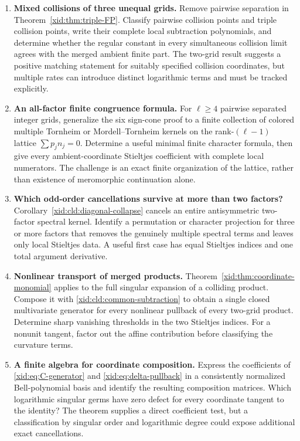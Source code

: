\begin{enumerate}[label=\textbf{Q\arabic*.},leftmargin=*]
\item \textbf{Mixed collisions of three unequal grids.}
Remove pairwise separation in Theorem~\ref{xid:thm:triple-FP}. Classify
pairwise collision points and triple collision points, write their
complete local subtraction polynomials, and determine whether the
regular constant in every simultaneous collision limit agrees with the
merged ambient finite part. The two-grid result suggests a positive
matching statement for suitably specified collision coordinates, but
multiple rates can introduce distinct logarithmic terms and must be
tracked explicitly.

\item \textbf{An all-factor finite congruence formula.}
For $\ell\ge4$ pairwise separated integer grids, generalize the six
sign-cone proof to a finite collection of colored multiple Tornheim or
Mordell--Tornheim kernels on the rank-$(\ell-1)$ lattice
$\sum p_jn_j=0$. Determine a useful minimal finite character formula,
then give every ambient-coordinate Stieltjes coefficient with complete
local numerators. The challenge is an exact finite organization of the
lattice, rather than existence of meromorphic continuation alone.

\item \textbf{Which odd-order cancellations survive at more than two
factors?}
Corollary~\ref{xid:cld:diagonal-collapse} cancels an entire antisymmetric
two-factor spectral kernel. Identify a permutation or character
projection for three or more factors that removes the genuinely
multiple spectral terms and leaves only local Stieltjes data. A useful
first case has equal Stieltjes indices and one total argument derivative.

\item \textbf{Nonlinear transport of merged products.}
Theorem~\ref{xid:thm:coordinate-monomial} applies to the full singular
expansion of a colliding product. Compose it with
\eqref{xid:cld:common-subtraction} to obtain a single closed multivariate
generator for every nonlinear pullback of every two-grid product.
Determine sharp vanishing thresholds in the two Stieltjes indices.
For a nonunit tangent, factor out the affine contribution before
classifying the curvature terms.

\item \textbf{A finite algebra for coordinate composition.}
Express the coefficients of \eqref{xid:eq:C-generator} and
\eqref{xid:eq:delta-pullback} in a consistently normalized Bell-polynomial
basis and identify the resulting composition matrices. Which
logarithmic singular germs have zero defect for every coordinate tangent
to the identity? The theorem supplies a direct coefficient test, but a
classification by singular order and logarithmic degree could expose
additional exact cancellations.


\end{enumerate}
